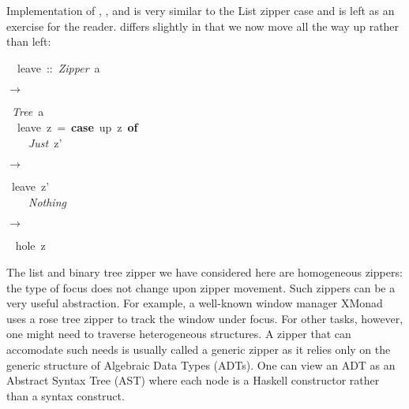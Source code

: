 \documentclass[runningheads]{llncs}
\newcommand{\texfamily}{\fontfamily{cmtex}\selectfont}
\newcommand{\WithMath}[2]{{\parbox[][][b]{\widthof{#1}}{\centering$#2$}}}
\begin{document}
  Implementation of , , and  is very similar to the
  List zipper case and is left as an exercise for the reader.  differs
  slightly in that we now move all the way up rather than left:
\begin{hscode}\SaveRestoreHook
~~leave~::~{\itshape Zipper}~a~\WithMath{->}{\rightarrow}~{\itshape Tree}~a
\\
\texfamily ~~leave~z~=~{\bfseries case}~up~z~{\bfseries of}
\\
\texfamily ~~~~{\itshape Just}~z'~\WithMath{->}{\rightarrow}~leave~z'
\\
\texfamily ~~~~{\itshape Nothing}~\WithMath{->}{\rightarrow}~ hole~z
\ColumnHook
\end{hscode}\resethooks


  The list and binary tree zipper we have considered here are homogeneous
  zippers: the type of focus does not change upon zipper movement. Such zippers
  can be a very useful abstraction. For example, a well-known window manager
  XMonad\cite{xmonad} uses a rose tree zipper to track the window under focus.
  For other tasks, however, one might need to traverse heterogeneous structures.
  A zipper that can accomodate such needs is usually called a generic zipper as
  it relies only on the generic structure of Algebraic Data Types (ADTs). One
  can view an ADT as an Abstract Syntax Tree (AST) where each node is a Haskell
  constructor rather than a syntax construct.
\end{document}
